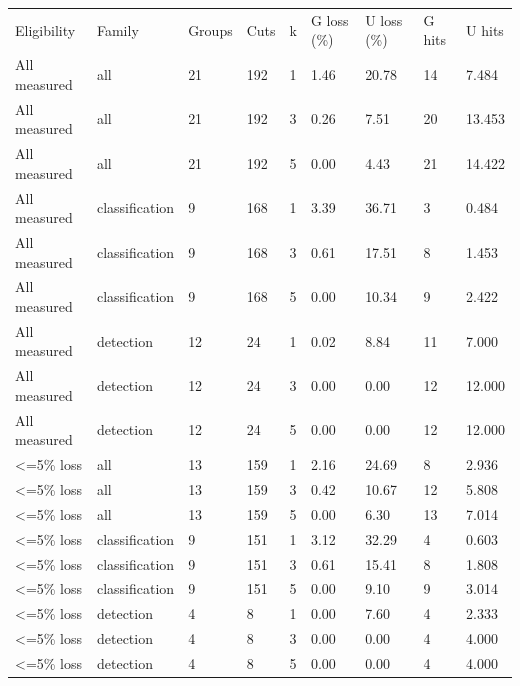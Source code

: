 \begin{tabular}{lllllllll}
Eligibility & Family & Groups & Cuts & k & G loss (\%) & U loss (\%) & G hits & U hits \\
All measured & all & 21 & 192 & 1 & 1.46 & 20.78 & 14 & 7.484 \\
All measured & all & 21 & 192 & 3 & 0.26 & 7.51 & 20 & 13.453 \\
All measured & all & 21 & 192 & 5 & 0.00 & 4.43 & 21 & 14.422 \\
All measured & classification & 9 & 168 & 1 & 3.39 & 36.71 & 3 & 0.484 \\
All measured & classification & 9 & 168 & 3 & 0.61 & 17.51 & 8 & 1.453 \\
All measured & classification & 9 & 168 & 5 & 0.00 & 10.34 & 9 & 2.422 \\
All measured & detection & 12 & 24 & 1 & 0.02 & 8.84 & 11 & 7.000 \\
All measured & detection & 12 & 24 & 3 & 0.00 & 0.00 & 12 & 12.000 \\
All measured & detection & 12 & 24 & 5 & 0.00 & 0.00 & 12 & 12.000 \\
<=5\% loss & all & 13 & 159 & 1 & 2.16 & 24.69 & 8 & 2.936 \\
<=5\% loss & all & 13 & 159 & 3 & 0.42 & 10.67 & 12 & 5.808 \\
<=5\% loss & all & 13 & 159 & 5 & 0.00 & 6.30 & 13 & 7.014 \\
<=5\% loss & classification & 9 & 151 & 1 & 3.12 & 32.29 & 4 & 0.603 \\
<=5\% loss & classification & 9 & 151 & 3 & 0.61 & 15.41 & 8 & 1.808 \\
<=5\% loss & classification & 9 & 151 & 5 & 0.00 & 9.10 & 9 & 3.014 \\
<=5\% loss & detection & 4 & 8 & 1 & 0.00 & 7.60 & 4 & 2.333 \\
<=5\% loss & detection & 4 & 8 & 3 & 0.00 & 0.00 & 4 & 4.000 \\
<=5\% loss & detection & 4 & 8 & 5 & 0.00 & 0.00 & 4 & 4.000 \\
\end{tabular}
